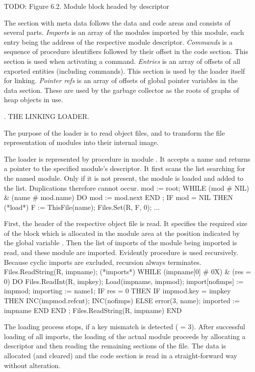 TODO: Figure 6.2. Module block headed by descriptor

The section with meta data follows the data and code areas and consists of several parts. \emph{Imports} is an array of the modules imported by this module, each entry being the address of the respective module descriptor. \emph{Commands} is a sequence of procedure identifiers followed by their offset in the code section. This section is used when activating a command. \emph{Entries} is an array of offsets of all exported entities (including commands). This section is used by the loader itself for linking. \emph{Pointer refs} is an array of offsets of global pointer variables in the data section. These are used by the garbage collector as the roots of graphs of heap objects in use.

. THE LINKING LOADER.

The purpose of the loader is to read object files, and to transform the file representation of modules into their internal image.

The loader is represented by procedure  in module . It accepts a name and returns a pointer to the specified module's descriptor. It first scans the list searching for the named module. Only if it is not present, the module is loaded and added to the list. Duplications therefore cannot occur.
\begintt
mod := root;
WHILE (mod # NIL) & (name # mod.name) DO mod := mod.next END ;
IF mod = NIL THEN (*load*) F := ThisFile(name); Files.Set(R, F, 0); ...
\endtt

\noindent First, the header of the respective object file is read. It specifies the required size of the block which is allocated in the module area at the position indicated by the global variable . Then the list of imports of the module being imported is read, and these module are imported. Evidently procedure  is used recursively. Because cyclic imports are excluded, recursion always terminates.
\begintt
Files.ReadString(R, impname); (*imports*)
WHILE (impname[0] # 0X) & (res = 0) DO
  Files.ReadInt(R, impkey);
  Load(impname, impmod); import[nofimps] := impmod; importing := name1;
  IF res = 0 THEN
    IF impmod.key = impkey THEN INC(impmod.refcnt); INC(nofimps)
    ELSE error(3, name); imported := impname
    END
  END ;
  Files.ReadString(R, impname)
END
\endtt

\noindent 
The loading process stops, if a key mismatch is detected ( = 3). After successful loading of all imports, the loading of the actual module proceeds by allocating a descriptor and then reading the remaining sections of the file. The data is allocated (and cleared) and the code section is read in a straight-forward way without alteration.

